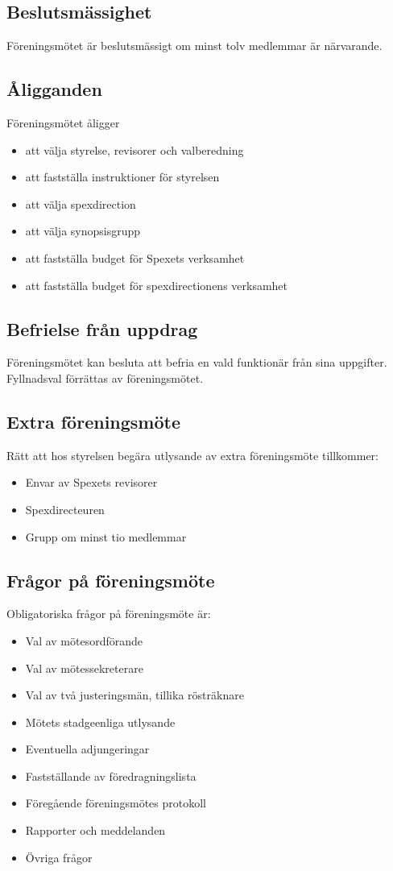 \documentclass[a4paper]{article}
\begin{document}
\subsection{Beslutsmässighet}
Föreningsmötet är beslutsmässigt om minst tolv medlemmar är närvarande.

\subsection{Åligganden}
Föreningsmötet åligger

\begin{itemize}
  \item att välja styrelse, revisorer och valberedning
  \item att fastställa instruktioner för styrelsen
  \item att välja spexdirection
  \item att välja synopsisgrupp
  \item att fastställa budget för Spexets verksamhet
  \item att fastställa budget för spexdirectionens verksamhet
\end{itemize}

\subsection{Befrielse från uppdrag}
Föreningsmötet kan besluta att befria en vald funktionär från sina uppgifter. Fyllnadsval förrättas av föreningsmötet.

\subsection{Extra föreningsmöte}
Rätt att hos styrelsen begära utlysande av extra föreningsmöte tillkommer:

\begin{itemize}
  \item Envar av Spexets revisorer
  \item Spexdirecteuren
  \item Grupp om minst tio medlemmar
\end{itemize}

\subsection{Frågor på föreningsmöte}
Obligatoriska frågor på föreningsmöte är:

\begin{itemize}
  \item Val av mötesordförande
  \item Val av mötessekreterare
  \item Val av två justeringsmän, tillika rösträknare
  \item Mötets stadgeenliga utlysande
  \item Eventuella adjungeringar
  \item Fastställande av föredragningslista
  \item Föregående föreningsmötes protokoll
  \item Rapporter och meddelanden
  \item Övriga frågor
\end{itemize}
\end{document}
